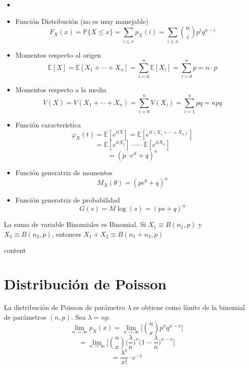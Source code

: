 \begin{prop}
  \begin{itemize}
    \item []
    \item Función Distribución (no es muy manejable)
      \[ 
        F_{X}(x) = \mathbb{P} \{ X \leq x \} = \sum_{i \leq x} p_{X}(i) = \sum_{i \leq x} \binom{n}{i} p ^{i} q^{n - i}
      \] 
    \item Momentos respecto al origen
      \[ 
        \mathbb{E} [ X ] = \mathbb{E} [ X_{1} + \cdots + X_{n} ] = \sum_{i = 0}^{n} \mathbb{E} [ X_{i} ] = \sum_{i = 0}^{n} p = n \cdot p 
      \] 
    \item Momentos respecto a la media
      \[ 
        V(X) = V(X_{1} + \cdots + X_{n}) = \sum_{i = 0}^{n} V(X_{i}) = \sum_{i = 1}^{n} pq = npq 
      \] 
    \item Función característica
      \[ 
        \varphi_{X}(t) = \mathbb{E} [ e^{itX} ] = \mathbb{E} [ e^{it(X_{1} + \cdots + X_{n})} ]
      \] 
      \[ 
        = \mathbb{E} [ e^{it X_{1}} ] \cdot \cdots \cdot \mathbb{E} [ e^{it X_{n}} ]
      \] 
      \[ 
        = (p \cdot e^{it} + q)^{n}
      \] 
    \item Función generatriz de momentos
      \[ 
        M_{X}(\theta) = (p e^{\theta} + q)^{n} 
      \] 
    \item Función generatriz de probabilidad
      \[ 
        G(s) = M \log (s) = (ps + q)^{n} 
      \] 
  \end{itemize}
\end{prop}

\begin{theo}
  La suma de variable Binomiales es Binomial. Si $X_{1} \equiv B(n_{1}, p)$ y $X_{2} \equiv B(n_{2}, p)$, entonces $X_{1} + X_{2} \equiv B(n_{1} + n_{2}, p)$
\end{theo}

\begin{dem}
  content
\end{dem}

\section{Distribución de Poisson}

La distribución de Poisson de parámetro $\lambda$ se obtiene como límite de la binomial de parámetros $(n, p)$. Sea $\lambda = np$.
\[ 
  \lim_{n \to \infty} p_{X}(x) = \lim_{n \to \infty} \Bigg [ \binom{n}{x}p ^{n} q^{n - x} \Bigg ]
\] 
\[ 
  = \lim_{n \to \infty} \Big [ \binom{n}{x} \Big ( \frac{\lambda}{n} \Big )^{x} \Big ( 1 - \frac{\lambda}{n} \Big )^{n-x} \Big ]  
\] 
\[ 
  = \frac{\lambda^{x}}{x!} \cdot e^{-\lambda} 
\] 

